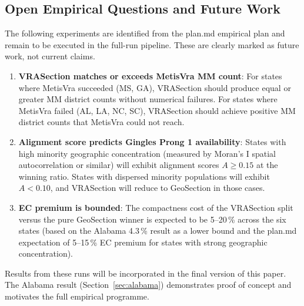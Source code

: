 \subsection{Open Empirical Questions and Future Work}

The following experiments are identified from the plan.md empirical plan and
remain to be executed in the full-run pipeline.
These are clearly marked as future work, not current claims.

\begin{enumerate}
\item \textbf{VRASection matches or exceeds MetisVra MM count}: For states
  where MetisVra succeeded (MS, GA), VRASection should produce equal or
  greater MM district counts without numerical failures.
  For states where MetisVra failed (AL, LA, NC, SC), VRASection should
  achieve positive MM district counts that MetisVra could not reach.

\item \textbf{Alignment score predicts Gingles Prong 1 availability}:
  States with high minority geographic concentration (measured by
  Moran's I spatial autocorrelation or similar) will exhibit alignment
  scores $A \geq 0.15$ at the winning ratio.
  States with dispersed minority populations will exhibit $A < 0.10$,
  and VRASection will reduce to GeoSection in those cases.

\item \textbf{EC premium is bounded}: The compactness cost of the VRASection
  split versus the pure GeoSection winner is expected to be 5--20\,\% across
  the six states (based on the Alabama 4.3\,\% result as a lower bound
  and the plan.md expectation of 5--15\,\% EC premium for states with strong
  geographic concentration).
\end{enumerate}

Results from these runs will be incorporated in the final version of this paper.
The Alabama result (Section~\ref{sec:alabama}) demonstrates proof of concept
and motivates the full empirical programme.
